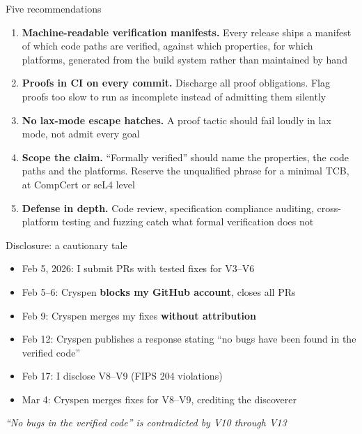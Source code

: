 \ifdefined\PRESENTATION\else\PassOptionsToClass{handout}{beamer}\fi\documentclass[aspectratio=169, lualatex]{beamer}
\begin{document}
\begin{frame}{Five recommendations}
	\begin{enumerate}
		\item \textbf{Machine-readable verification manifests.} Every release ships a manifest of which code paths are verified, against which properties, for which platforms, generated from the build system rather than maintained by hand
		\item \textbf{Proofs in CI on every commit.} Discharge all proof obligations. Flag proofs too slow to run as incomplete instead of admitting them silently
		\item \textbf{No lax-mode escape hatches.} A proof tactic should fail loudly in lax mode, not admit every goal
		\item \textbf{Scope the claim.} ``Formally verified'' should name the properties, the code paths and the platforms. Reserve the unqualified phrase for a minimal TCB, at CompCert or seL4 level
		\item \textbf{Defense in depth.} Code review, specification compliance auditing, cross-platform testing and fuzzing catch what formal verification does not
	\end{enumerate}
\end{frame}

\begin{frame}{Disclosure: a cautionary tale}
	\begin{itemize}
		\item Feb 5, 2026: I submit PRs with tested fixes for V3--V6
		\item Feb 5--6: Cryspen \textbf{blocks my GitHub account}, closes all PRs
		\item Feb 9: Cryspen merges my fixes \textbf{without attribution}
		\item Feb 12: Cryspen publishes a response stating ``no bugs have been found in the verified code''
		\item Feb 17: I disclose V8--V9 (FIPS 204 violations)
		\item Mar 4: Cryspen merges fixes for V8--V9, crediting the discoverer
	\end{itemize}
	\vspace{0.5em}
	\begin{center}
		\textit{``No bugs in the verified code'' is contradicted by V10 through V13}
	\end{center}
\end{frame}
\end{document}
